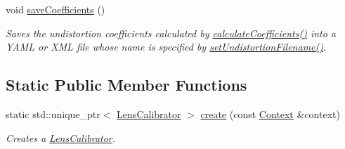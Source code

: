 \begin{DoxyCompactItemize}
\mbox{\label{classstereo__ugv_1_1LensCalibrator_a770bc3091deec850b75b72d11ee9bda7}} 
void \hyperlink{classstereo__ugv_1_1LensCalibrator_a770bc3091deec850b75b72d11ee9bda7}{save\+Coefficients} ()
\begin{DoxyCompactList}\small\item\em Saves the undistortion coefficients calculated by \hyperlink{classstereo__ugv_1_1LensCalibrator_aeeb532144b29ae7004ee14e2695def97}{calculate\+Coefficients()} into a Y\+A\+ML or X\+ML file whose name is specified by \hyperlink{classstereo__ugv_1_1LensCalibrator_a4debdb4b31e7b474576269cc15da15d7}{set\+Undistortion\+Filename()}. \end{DoxyCompactList}\end{DoxyCompactItemize}
\subsection*{Static Public Member Functions}
\begin{DoxyCompactItemize}
\item 
static std\+::unique\+\_\+ptr$<$ \hyperlink{classstereo__ugv_1_1LensCalibrator}{Lens\+Calibrator} $>$ \hyperlink{classstereo__ugv_1_1LensCalibrator_ae19b071e8cb8c015351d4717f79f9184}{create} (const \hyperlink{classstereo__ugv_1_1Context}{Context} \&context)
\begin{DoxyCompactList}\small\item\em Creates a \hyperlink{classstereo__ugv_1_1LensCalibrator}{Lens\+Calibrator}. \end{DoxyCompactList}\end{DoxyCompactItemize}
